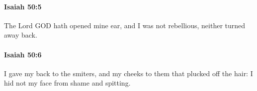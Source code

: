 		\paragraph{Isaiah 50:5} %
			\label{ISAIAH-50-5}

			The Lord GOD hath opened mine ear, and I was not rebellious, neither turned away back.


		\paragraph{Isaiah 50:6} %
			\label{ISAIAH-50-6}

			I gave my back to the smiters, and my cheeks to them that plucked off the hair: I hid not my face from shame and spitting.



